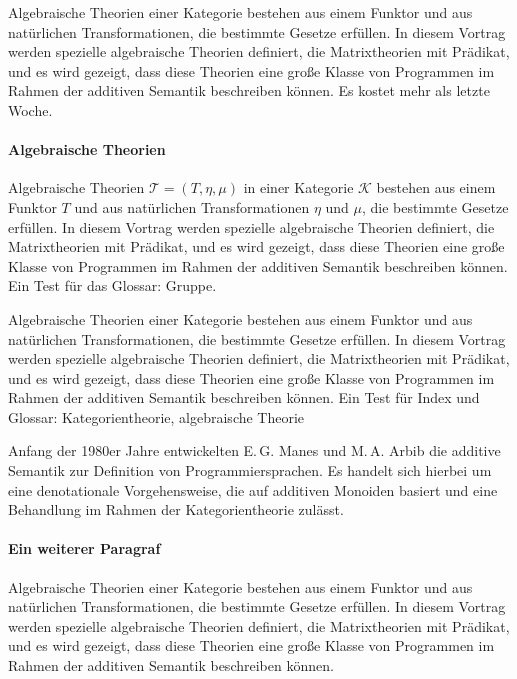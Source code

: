 Algebraische Theorien einer Kategorie bestehen aus einem Funktor und
aus natürlichen Transformationen, die bestimmte Gesetze erfüllen. In
diesem Vortrag werden spezielle algebraische Theorien definiert, die
Matrixtheorien mit Prädikat, und es wird gezeigt, dass diese Theorien
eine große Klasse von Programmen im Rahmen der additiven Semantik
beschreiben können. Es kostet  mehr als letzte Woche.

\paragraph{Algebraische Theorien}

Algebraische Theorien $\mathcal{T}=(T,\eta,\mu)$ in einer Kategorie
$\mathcal{K}$ bestehen aus einem Funktor $T$ und aus natürlichen
Transformationen $\eta$ und $\mu$, die bestimmte Gesetze erfüllen. In
diesem Vortrag werden spezielle algebraische Theorien definiert, die
Matrixtheorien mit Prädikat, und es wird gezeigt, dass diese Theorien
eine große Klasse von Programmen im Rahmen der additiven Semantik
beschreiben können. Ein Test für das Glossar: Gruppe\gruppe.

Algebraische Theorien einer Kategorie bestehen aus einem Funktor und
aus natürlichen Transformationen, die bestimmte Gesetze erfüllen. In
diesem Vortrag werden spezielle algebraische Theorien definiert, die
Matrixtheorien mit Prädikat, und es wird gezeigt, dass diese Theorien
eine große Klasse von Programmen im Rahmen der additiven Semantik
beschreiben können. Ein Test für Index und Glossar:
Kategorientheorie,
algebraische Theorie\algtheorie

Anfang der 1980er Jahre entwickelten E.\,G. Manes und M.\,A. Arbib die
additive Semantik zur Definition von Programmiersprachen. Es handelt
sich hierbei um eine denotationale Vorgehensweise, die auf additiven
Monoiden basiert und eine Behandlung im Rahmen der Kategorientheorie
zulässt.

\paragraph{Ein weiterer Paragraf}

Algebraische Theorien einer Kategorie bestehen aus einem Funktor und
aus natürlichen Transformationen, die bestimmte Gesetze erfüllen. In
diesem Vortrag werden spezielle algebraische Theorien definiert, die
Matrixtheorien mit Prädikat, und es wird gezeigt, dass diese Theorien
eine große Klasse von Programmen im Rahmen der additiven Semantik
beschreiben können.

